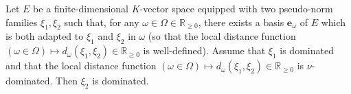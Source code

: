 \documentclass [11pt,reqno]{amsart}
\def\bR{{\mathbb{R}}}
\newcommand{\1}{\mathmybb{1}}
\def\diff{\mathrm{d}}
\def\setminus{\smallsetminus}
\def\upint{\mathchoice%
    {\mkern13mu\overline{\vphantom{\intop}\mkern7mu}\mkern-20mu}%
    {\mkern7mu\overline{\vphantom{\intop}\mkern7mu}\mkern-14mu}%
    {\mkern7mu\overline{\vphantom{\intop}\mkern7mu}\mkern-14mu}%
    {\mkern7mu\overline{\vphantom{\intop}\mkern7mu}\mkern-14mu}%
  \int}
\begin{document}
\begin{proposition}
\label{prop:CM_4.1.6}
Let $E$ be a finite-dimensional $K$-vector space equipped with two pseudo-norm families $\xi_1,\xi_2$ such that, for any $\omega\in\Omega\in \bR_{\geq 0}$, there exists a basis $\mathbf{e}_{\omega}$ of $E$ which is both adapted to $\xi_1$ and $\xi_2$ in $\omega$ (so that the local distance function $(\omega\in\Omega)\mapsto d_{\omega}(\xi_1,\xi_2)\in \bR_{\geq 0}$ is well-defined). Assume that $\xi_1$ is dominated and that the local distance function $(\omega\in\Omega)\mapsto d_{\omega}(\xi_1,\xi_2)\in\bR_{\geq 0}$ is $\nu$-dominated. Then $\xi_2$ is dominated.
\end{proposition}

\end{document}
